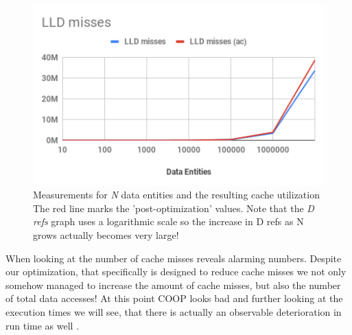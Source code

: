 \begin{figure}[ht]
\begin{minipage}[b]{0.333\linewidth}
	\end{minipage}
\hspace{-0.3cm}
	\begin{minipage}[b]{0.333\linewidth}
		\centering
		\includegraphics[width=\textwidth,height=\textwidth]{PICs/test_file_lld_misses}
	\end{minipage}
\vspace{-0.5cm}
\caption{Measurements for \textit{N} data entities and the resulting cache utilization The red line marks the 'post-optimization' values. Note that the \textit{D refs} graph uses a logarithmic scale so the increase in D refs as N grows actually becomes very large!}
\label{test_file_is_it_bad}
\end{figure}
When looking at the number of cache misses  reveals alarming numbers. Despite our optimization, that specifically is designed to reduce cache misses we not only somehow managed to increase the amount of cache misses, but also the number of total data accesses! At this point COOP looks bad and further looking at the execution times we will see, that there is actually an observable deterioration in run time as well .
